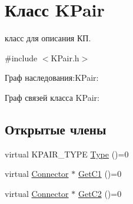 \hypertarget{class_k_pair}{
\section{Класс KPair}
\label{class_k_pair}
}


класс для описания КП.  




{\ttfamily \#include $<$KPair.h$>$}



Граф наследования:KPair:


Граф связей класса KPair:
\subsection*{Открытые члены}
\begin{DoxyCompactItemize}
\item 
virtual KPAIR\_\-TYPE \hyperlink{class_k_pair_a49bd9e2395097a4526cb0798892b0bb4}{Type} ()=0
\item 
virtual \hyperlink{struct_connector}{Connector} $\ast$ \hyperlink{class_k_pair_a7b3efb4bf1ee83454b2cac85b3bae2ec}{GetC1} ()=0
\item 
virtual \hyperlink{struct_connector}{Connector} $\ast$ \hyperlink{class_k_pair_af509813d22d38fcfad3266a9c78c94e7}{GetC2} ()=0
\end{DoxyCompactItemize}
